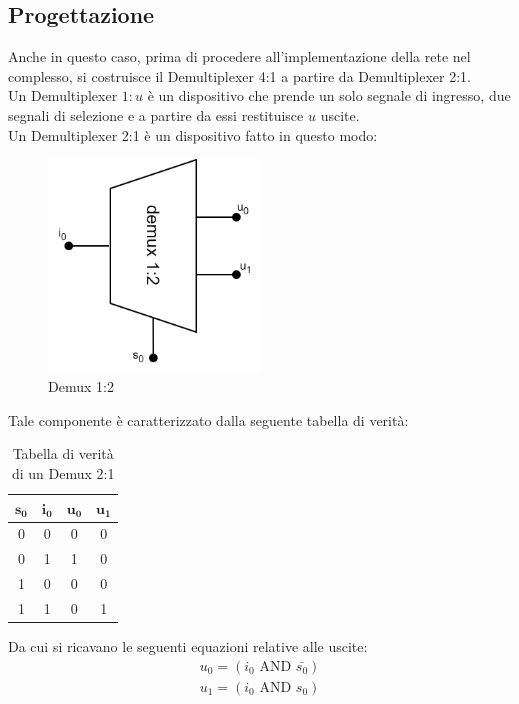 \subsection{Progettazione}
 Anche in questo caso, prima di procedere all'implementazione della rete nel complesso, si costruisce il Demultiplexer 4:1 a partire da Demultiplexer 2:1.\\
Un Demultiplexer $1:u$ è un dispositivo che prende un solo segnale di ingresso, due segnali di selezione e a partire da essi restituisce $u$ uscite. \\
Un Demultiplexer 2:1 è un dispositivo fatto in questo modo:
 \begin{figure}[H]
	\centering
	\includegraphics[width=0.5\textwidth]{img/demux_1_2}
	\caption{Demux 1:2}
	\label{Demux 1:2} 
\end{figure}
Tale componente è caratterizzato dalla seguente tabella di verità:
\begin{table}[H]
    \centering
    \begin{tabular}{||c|c|c||c||}
        \hline
        \hline
         $\mathbf{s_0}$ & $\mathbf{i_0}$ & $\mathbf{u_0}$ & $\mathbf{u_1}$\\
         \hline
         0 & 0 & 0 & 0 \\
         \hline
         0 & 1 & 1 & 0 \\
         \hline
         1 & 0 & 0 & 0 \\
         \hline
         1 & 1 & 0 & 1 \\
         \hline
         \hline 
    \end{tabular}
    \caption{Tabella di verità di un Demux 2:1}
    \label{tab:demux_2:1}
\end{table}
Da cui si ricavano le seguenti equazioni relative alle uscite:
\begin{equation*}
    \begin{aligned}
          u_0 = (i_0 \text{ AND } \bar{s_0})\\
          u_1 = (i_0 \text{ AND } {s_0})
    \end{aligned}
    \end{equation*}
